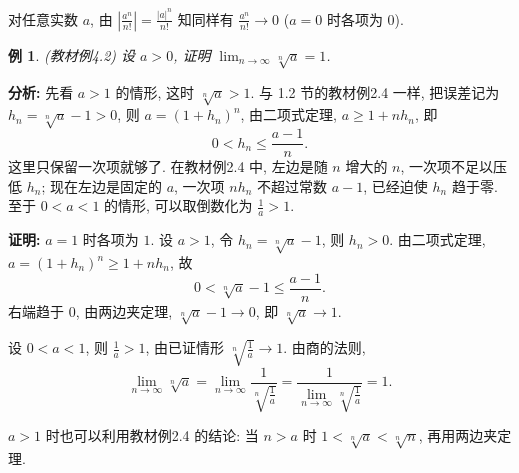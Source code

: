 \documentclass[UTF8,openany]{ctexbook}
\theoremstyle{chinesetextbook}
\newtheorem{example}{例}[section]
\newenvironment{cnproof}{\par\indent\textbf{证明:} \ignorespaces}{\par}
\begin{document}
对任意实数 $a$, 由 $\displaystyle\left|\frac{a^n}{n!}\right|=\frac{|a|^n}{n!}$ 知同样有 $\displaystyle\frac{a^n}{n!}\to0$ ($a=0$ 时各项为 $0$).
\begin{example}
\textnormal{(教材例4.2)} 设 $a>0$, 证明 $\displaystyle\lim_{n\to\infty}\sqrt[n]a=1$.
\end{example}
\par\indent\textbf{分析:} 先看 $a>1$ 的情形, 这时 $\sqrt[n]a>1$. 与 1.2 节的教材例2.4 一样, 把误差记为 $h_n=\sqrt[n]a-1>0$, 则 $a=(1+h_n)^n$, 由二项式定理, $a\ge1+nh_n$, 即
\[
0<h_n\le\frac{a-1}n.
\]
这里只保留一次项就够了. 在教材例2.4 中, 左边是随 $n$ 增大的 $n$, 一次项不足以压低 $h_n$; 现在左边是固定的 $a$, 一次项 $nh_n$ 不超过常数 $a-1$, 已经迫使 $h_n$ 趋于零. 至于 $0<a<1$ 的情形, 可以取倒数化为 $\displaystyle\frac1a>1$.
\begin{cnproof}
$a=1$ 时各项为 $1$. 设 $a>1$, 令 $h_n=\sqrt[n]a-1$, 则 $h_n>0$. 由二项式定理, $a=(1+h_n)^n\ge1+nh_n$, 故
\[
0<\sqrt[n]a-1\le\frac{a-1}n.
\]
右端趋于 $0$, 由两边夹定理, $\sqrt[n]a-1\to0$, 即 $\sqrt[n]a\to1$.

设 $0<a<1$, 则 $\displaystyle\frac1a>1$, 由已证情形 $\displaystyle\sqrt[n]{\frac1a}\to1$. 由商的法则,
\[
\lim_{n\to\infty}\sqrt[n]a=\lim_{n\to\infty}\frac1{\sqrt[n]{\frac1a}}=\frac1{\displaystyle\lim_{n\to\infty}\sqrt[n]{\frac1a}}=1.
\]
\end{cnproof}
$a>1$ 时也可以利用教材例2.4 的结论: 当 $n>a$ 时 $1<\sqrt[n]a<\sqrt[n]n$, 再用两边夹定理.
\end{document}
